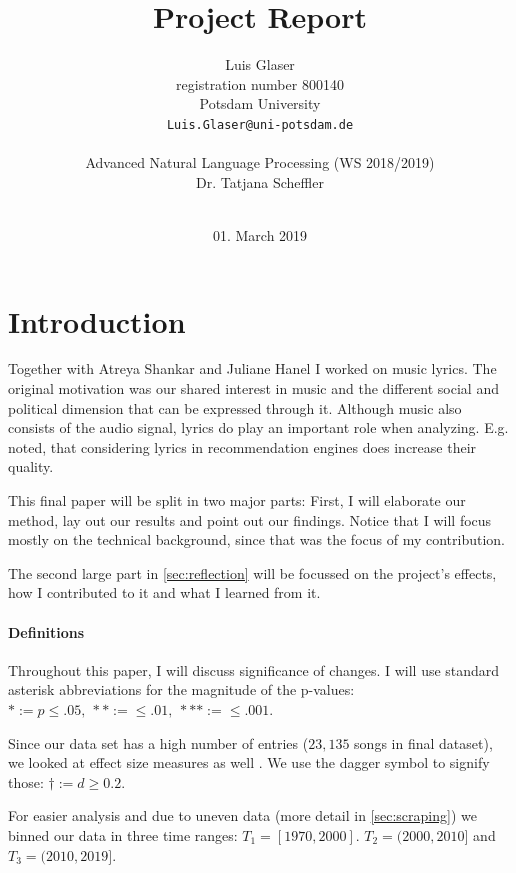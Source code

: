 \documentclass[11pt,a4paper]{article}
\title{Project Report}
\author{Luis Glaser\\
  registration number 800140 \\
  Potsdam University \\
  {\tt Luis.Glaser@uni-potsdam.de} \\
  \\
  Advanced Natural Language Processing (WS 2018/2019) \\
  Dr. Tatjana Scheffler \\
  \\}
\date{01. March 2019}
\begin{document}
\maketitle


\section{Introduction}\label{sec:introduction}
Together with Atreya Shankar and Juliane Hanel I worked on music lyrics. The original motivation was our shared interest in music and the different social and political dimension that can be expressed through it. Although music also consists of the audio signal, lyrics do play an important role when analyzing. E.g. \citet{DBLP:conf/coling/FellS14} noted, that considering lyrics in recommendation engines does increase their quality.

This final paper will be split in two major parts: First, I will elaborate our method, lay out our results and point out our findings. Notice that I will focus mostly on the technical background, since that was the focus of my contribution.

The second large part in \cref{sec:reflection} will be focussed on the project's effects, how I contributed to it and what I learned from it. 
\paragraph{Definitions}\label{sec:definitions}

Throughout this paper, I will discuss significance of changes. I will use standard asterisk abbreviations for the magnitude of the p-values: $* := p \leq .05,\ ** := \leq .01,\ *** := \leq .001$.

Since our data set has a high number of entries ($23,135$ songs in final dataset), we looked at effect size measures as well \citep{Psychdict}.
We use the dagger symbol to signify those: $\dagger := d \geq 0.2$.

For easier analysis and due to uneven data (more detail in \cref{sec:scraping}) we binned our data in three time ranges:
$T_1 = [1970,2000]$. $T_2 = (2000,2010]$ and $T_3 = (2010,2019]$.
\end{document}
